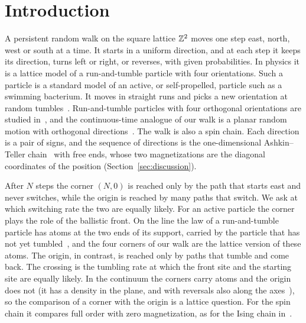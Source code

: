 \section{Introduction}\label{sec:intro}

A persistent random walk on the square lattice $\mathbb{Z}^2$ moves one step east,
north, west or south at a time. It starts in a uniform direction, and at each
step it keeps its direction, turns left or right, or reverses, with given
probabilities. In physics it is a lattice model of a run-and-tumble particle
with four orientations. Such a particle is a standard model of an active, or
self-propelled, particle such as a swimming bacterium. It moves in straight runs
and picks a new orientation at random tumbles~\cite{tailleurcates2008,bechinger2016}.
Run-and-tumble particles with four orthogonal orientations are studied
in~\cite{santra2020,angelani2022}, and the continuous-time analogue of our walk
is a planar random motion with orthogonal
directions~\cite{cinqueorsingher2023,orsingher2000,kolesnikorsingher2002}.
The walk is also a spin chain. Each direction is a pair of signs, and the
sequence of directions is the one-dimensional Ashkin--Teller
chain~\cite{ashkinteller1943} with free ends, whose two magnetizations are the
diagonal coordinates of the position (Section~\ref{sec:discussion}).

After $N$ steps the corner $(N,0)$ is reached only by the path that starts east
and never switches, while the origin is reached by many paths that switch. We
ask at which switching rate the two are equally likely. For an active particle
the corner plays the role of the ballistic front. On the line the law of a
run-and-tumble particle has atoms at the two ends of its support, carried by
the particle that has not yet tumbled~\cite{malakar2018}, and the
four corners of our walk are the lattice version of these atoms. The origin, in
contrast, is reached only by paths that tumble and come back. The crossing is
the tumbling rate at which the front site and the starting site are equally
likely. In the continuum
the corners carry atoms and the origin does not (it has a density in the plane,
and with reversals also along the axes~\cite{kolesnikorsingher2002}), so the
comparison of a corner with the origin is a lattice question. For the
spin chain it compares full order with zero magnetization, as for the Ising
chain in~\cite{paperA}.


